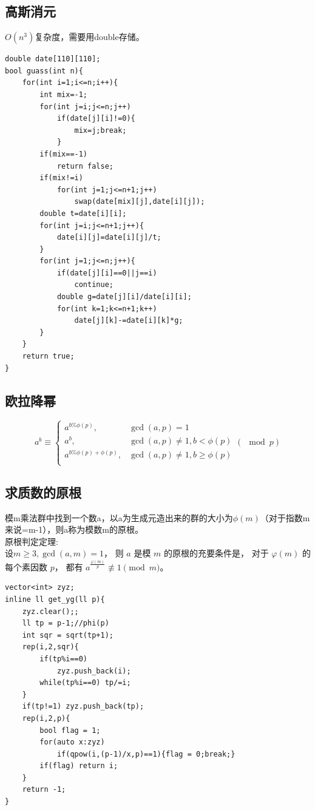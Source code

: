 \documentclass[a4]{ctexart}
\begin{document}
\subsection{高斯消元}
$O(n^3)$复杂度，需要用double存储。
\begin{lstlisting}
double date[110][110];
bool guass(int n){
    for(int i=1;i<=n;i++){
        int mix=-1;
        for(int j=i;j<=n;j++)
            if(date[j][i]!=0){
                mix=j;break;
            }
        if(mix==-1)
            return false;
        if(mix!=i)
            for(int j=1;j<=n+1;j++)
                swap(date[mix][j],date[i][j]);
        double t=date[i][i];
        for(int j=i;j<=n+1;j++){
            date[i][j]=date[i][j]/t;
        }
        for(int j=1;j<=n;j++){
            if(date[j][i]==0||j==i)
                continue;
            double g=date[j][i]/date[i][i];
            for(int k=1;k<=n+1;k++)
                date[j][k]-=date[i][k]*g;
        }
    }                                                                         
    return true;
}
\end{lstlisting}

\subsection{欧拉降幂}
$$
a^b \equiv \begin{cases}
a^{b\%\phi(p)} , & \gcd(a,p)=1\\
a^b , & \gcd(a,p)\neq 1,b<\phi(p)\\
a^{b\%\phi(p)+\phi(p)} , & \gcd(a,p)\neq 1 , b\geq \phi(p)\\
\end{cases}
(\mod p)
$$

\subsection{求质数的原根}
模m乘法群中找到一个数a，以a为生成元造出来的群的大小为$\phi(m)$（对于指数m来说=m-1），则a称为模数m的原根。\\
原根判定定理:\\
设$m \geq 3, \gcd(a,m)=1$，
则 $a$ 是模 $m$ 的原根的充要条件是，
对于 $\varphi(m)$ 的每个素因数 $p$，
都有 $a^{\frac{\varphi(m)}{p}}\not\equiv 1\pmod m$。
\begin{lstlisting}
vector<int> zyz;
inline ll get_yg(ll p){
    zyz.clear();;
    ll tp = p-1;//phi(p)
    int sqr = sqrt(tp+1);
    rep(i,2,sqr){
        if(tp%i==0)
            zyz.push_back(i);
        while(tp%i==0) tp/=i;
    }
    if(tp!=1) zyz.push_back(tp);
    rep(i,2,p){
        bool flag = 1;
        for(auto x:zyz)
            if(qpow(i,(p-1)/x,p)==1){flag = 0;break;}
        if(flag) return i;
    }
    return -1;
}
\end{lstlisting}
 
\end{document}
